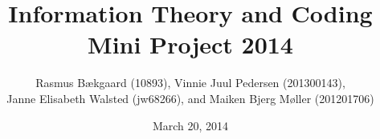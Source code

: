 \documentclass[10pt, oneside]{article}
\title{Information Theory and Coding \\ Mini Project 2014}
\author{Rasmus Bækgaard (10893), 
Vinnie Juul Pedersen (201300143),\\ 
Janne Elisabeth Walsted (jw68266), and 
Maiken Bjerg Møller (201201706)}
\date{March 20, 2014}
\begin{document}
\maketitle

\listoffixmes




%
%


\end{document}
